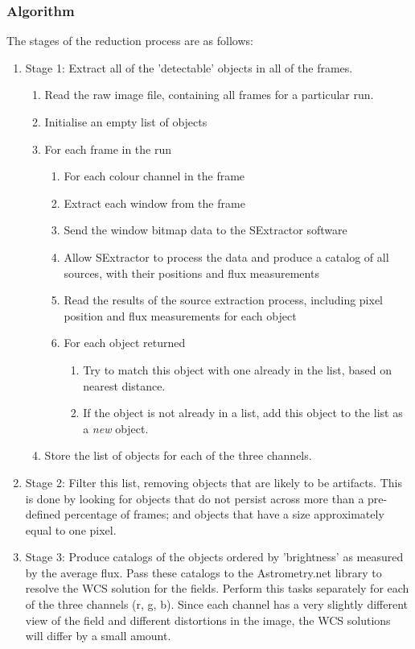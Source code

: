 \subsubsection{Algorithm}
The stages of the reduction process are as follows:
\begin{enumerate}
	\item Stage 1: Extract all of the 'detectable' objects in all of the frames. 
	\begin{enumerate}
		\item Read the raw image file, containing all frames for a particular run.
		\item Initialise an empty list of objects
		\item For each frame in the run
		\begin{enumerate}
			\item For each colour channel in the frame
			\item Extract each window from the frame
			\item Send the window bitmap data to the SExtractor software
			\item Allow SExtractor to process the data and produce a catalog of all sources, with their positions and flux measurements
			\item Read the results of the source extraction process, including pixel position and flux measurements for each object
			\item For each object returned
			\begin{enumerate} 
				\item Try to match this object with one already in the list, based on nearest distance.
				\item If the object is not already in a list, add this object to the list as a \emph{new} object.
			\end{enumerate}
		\end{enumerate}
		\item Store the list of objects for each of the three channels.
	\end{enumerate}
	\item Stage 2: Filter this list, removing objects that are likely to be artifacts. This is done by looking for objects that do not persist across more than a pre-defined percentage of frames; and objects that have a size approximately equal to one pixel. 
	\item Stage 3: Produce catalogs of the objects ordered by 'brightness' as measured by the average flux. Pass these catalogs to the Astrometry.net library to resolve the WCS solution for the fields. Perform this tasks separately for each of the three channels (r, g, b). Since each channel has a very slightly different view of the field and different distortions in the image, the WCS solutions will differ by a small amount.

\end{enumerate}
